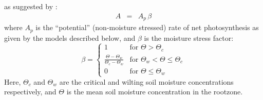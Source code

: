 \documentclass[a4paper]{article}
\begin{document}
as suggested by \citet{Cox98}:
\begin{eqnarray}
A &=& A_{p} \, \beta
\label{e:A4}
\end{eqnarray}
where $A_{p}$ is the ``potential'' (non-moisture stressed) rate of net
photosynthesis as given by the models described below, and $\beta$ is
the moisture stress factor:
\begin{equation}
\beta = \left \{ \begin{array}{lll}
              1 & \mbox{for $\Theta > \Theta_{c}$} \nonumber  \\ [5mm]
  \displaystyle{\frac{\Theta-\Theta_{w}}{\Theta_{c}-\Theta_{w}}}
     & \mbox{for $\Theta_{w} < \Theta \leq \Theta_{c}$} \nonumber \\ [5mm]
              0 & \mbox{for $\Theta \leq \Theta_{w}$} \
             \end{array} \right.
\label{e:A5}
\end{equation}
Here, $\Theta_{c}$ and $\Theta_{w}$ are the critical and wilting soil
moisture concentrations respectively, and $\Theta$ is the mean soil
moisture concentration in the rootzone.
\end{document}

